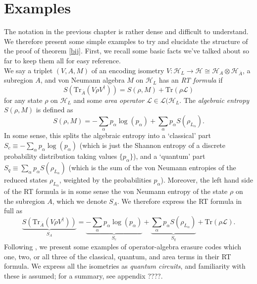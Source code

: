 \documentclass[12pt,a4paper]{report}
\numberwithin{equation}{section}
\newcommand{\ol}[1]{\overline{#1}}
\newcommand{\tr}{\text{Tr}}
\theoremstyle{definition}
\theoremstyle{theorem}
\theoremstyle{theorem}
\theoremstyle{example}
\theoremstyle{definition}
\begin{document}
\chapter{Examples}
The notation in the previous chapter is rather dense and difficult to understand. We therefore present some simple examples to try and elucidate the structure of the proof of theorem \ref{bij}. First, we recall some basic facts we've talked about so far to keep them all for easy reference.\\
We say a triplet $(V,A,M)$ of an encoding isometry $V:\mathcal{H}_{L}\to\mathcal{H}\cong\mathcal{H}_{A}\otimes\mathcal{H}_{\ol{A}}$, a subregion $A$, and von Neumann algebra $M$ on $\mathcal{H}_{L}$ has an \textit{RT formula} if
\begin{equation}
	S\left(\tr_{\ol{A}}\left(V\rho V^{\dagger}\right)\right)=S(\rho,M)+\tr\left(\rho\mathcal{L}\right)
\end{equation}
for any state $\rho$ on $\mathcal{H}_{L}$ and some \textit{area operator} $\mathcal{L}\in\mathcal{L}(\mathcal{H}_{L}$. The \textit{algebraic entropy} $S(\rho,M)$ is defined as
\begin{equation}
	S(\rho,M)=-\sum_{\alpha}p_{\alpha}\log\left(p_{\alpha}\right)+\sum_{\alpha}p_{\alpha}S\left(\rho_{L_{\alpha}}\right).
\end{equation} 
In some sense, this splits the algebraic entropy into a `classical' part $S_{c}\equiv-\sum_{\alpha}p_{\alpha}\log(p_{\alpha})$ (which is just the Shannon entropy of a discrete probability distribution taking values $\{p_{\alpha}\}$), and a `quantum' part $S_{q}\equiv \sum_{\alpha}p_{\alpha}S\left(\rho_{L_{\alpha}}\right)$ (which is the sum of the von Neumann entropies of the reduced states $\rho_{L_{\alpha}}$, weighted by the probabilities $p_{\alpha}$). Moreover, the left hand side of the RT formula is in some sense the von Neumann entropy of the state $\rho$ on the subregion $A$, which we denote $S_{A}$. We therefore express the RT formula in full as
\begin{equation}
	\underbrace{S\left(\tr_{\ol{A}}\left(V\rho V^{\dagger}\right)\right)}_{S_{A}}=\underbrace{-\sum_{\alpha}p_{\alpha}\log\left(p_{\alpha}\right)}_{S_{c}}+\underbrace{\sum_{\alpha}p_{\alpha}S\left(\rho_{L_{\alpha}}\right)}_{S_{q}}+\tr\left(\rho\mathcal{L}\right).
\end{equation}
Following \cite{Pollack}, we present some examples of operator-algebra erasure codes which one, two, or all three of the classical, quantum, and area terms in their RT formula. We express all the isometries as \textit{quantum circuits}, and familiarity with these is assumed; for a summary, see appendix ????.\\
\end{document}
